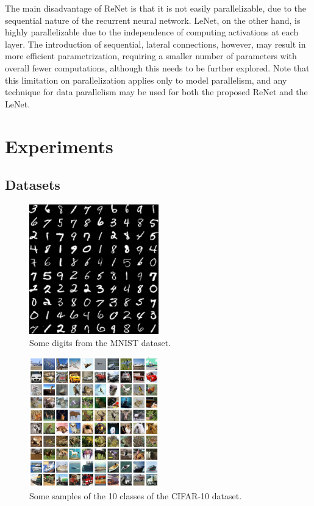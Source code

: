 The main disadvantage of ReNet is that it is not easily parallelizable, due to
the sequential nature of the recurrent neural network. LeNet, on the
other hand, is highly parallelizable due to the independence of computing
activations at each layer. The introduction of sequential, lateral connections,
however, may result in more efficient parametrization, requiring a smaller
number of parameters with overall fewer computations, although this needs to be
further explored. Note that this limitation on parallelization applies only to
model parallelism, and any technique for data parallelism may be used for both
the proposed ReNet and the LeNet.


\section{Experiments}\label{sec:renet_experiments}

\subsection{Datasets}

\begin{figure}[!t]
    \centering
    \includegraphics[width=0.5\textwidth]{img/renet/mnist_digits.png}
    \caption{Some digits from the MNIST dataset.}
    \label{fig:mnist_digits}
\end{figure}

\begin{figure}[!t]
    \centering
    \includegraphics[width=0.5\textwidth]{img/renet/cifar-10.png}
    \caption{Some samples of the 10 classes of the CIFAR-10 dataset.}
    \label{fig:cifar}
\end{figure}

